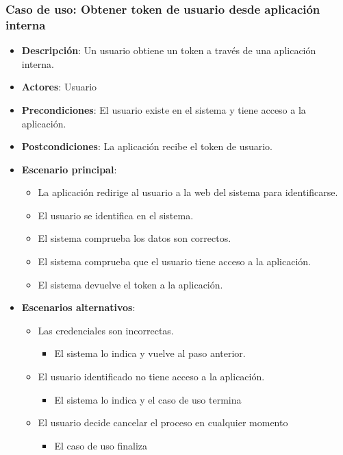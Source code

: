 \documentclass[12pt,a4paperpaper,]{report}
\providecommand{\tightlist}{%
  \setlength{\itemsep}{0pt}\setlength{\parskip}{0pt}}
\begin{document}
\subsubsection{Caso de uso: Obtener token de usuario desde aplicación
interna}\label{caso-de-uso-obtener-token-de-usuario-desde-aplicaciuxf3n-interna}

\begin{itemize}
\tightlist
\item
  \textbf{Descripción}: Un usuario obtiene un token a través de una
  aplicación interna.
\item
  \textbf{Actores}: Usuario
\item
  \textbf{Precondiciones}: El usuario existe en el sistema y tiene
  acceso a la aplicación.
\item
  \textbf{Postcondiciones}: La aplicación recibe el token de usuario.
\item
  \textbf{Escenario principal}:

  \begin{itemize}
  \tightlist
  \item
    La aplicación redirige al usuario a la web del sistema para
    identificarse.
  \item
    El usuario se identifica en el sistema.
  \item
    El sistema comprueba los datos son correctos.
  \item
    El sistema comprueba que el usuario tiene acceso a la aplicación.
  \item
    El sistema devuelve el token a la aplicación.
  \end{itemize}
\item
  \textbf{Escenarios alternativos}:

  \begin{itemize}
  \tightlist
  \item
    Las credenciales son incorrectas.

    \begin{itemize}
    \tightlist
    \item
      El sistema lo indica y vuelve al paso anterior.
    \end{itemize}
  \item
    El usuario identificado no tiene acceso a la aplicación.

    \begin{itemize}
    \tightlist
    \item
      El sistema lo indica y el caso de uso termina
    \end{itemize}
  \item
    El usuario decide cancelar el proceso en cualquier momento

    \begin{itemize}
    \tightlist
    \item
      El caso de uso finaliza
    \end{itemize}
  \end{itemize}
\end{itemize}
\end{document}
